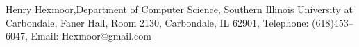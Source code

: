 \documentclass[10pt]{resume}
\begin{document}
\section{}{Henry Hexmoor,}{Department of Computer Science,
Southern Illinois University at Carbondale,
Faner Hall, Room 2130,
Carbondale, IL 62901, 
Telephone: (618)453--6047,
Email: Hexmoor@gmail.com }








\leftcolwidth{2em}
\colsep{0em}
\indentitems
\end{document}
